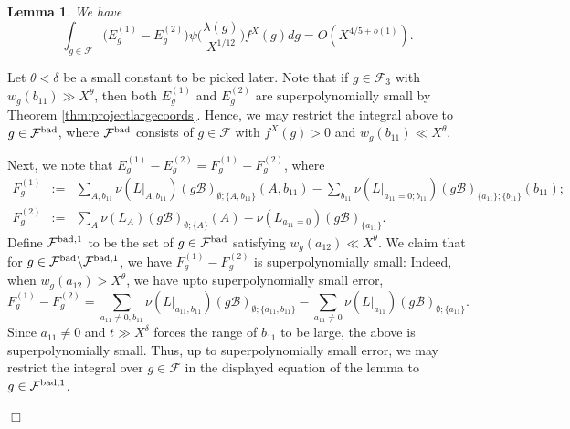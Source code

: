 \documentclass{article}
\def\bad{{\rm bad}}
\def\cB{{\mathcal B}}
\def\FF{{\mathcal F}}
\newtheorem{lemma}[theorem]{Lemma}
\newenvironment{proof}{\noindent {\bf Proof:}}{$\Box$ \vspace{2 ex}}
\begin{document}
\begin{lemma}\label{lem:Ab11_to_A_fiber}
We have
\begin{equation*}
\int_{g\in\FF}\bigl(E_g^{(1)}-E_g^{(2)}\bigr)
\psi\Big(\frac{\lambda(g)}{X^{1/12}}\Big)f^X(g)dg
=O(X^{4/5+o(1)}).
\end{equation*}
\end{lemma}
\begin{proof}
  Let $\theta<\delta$ be a small constant to be picked later. Note that if $g\in\FF_3$ with $w_g(b_{11})\gg X^\theta$, then both $E_g^{(1)}$ and $E_g^{(2)}$ are superpolynomially small by Theorem \ref{thm:projectlargecoords}. Hence, we may restrict the integral above to $g\in\FF^\bad$, where $\FF^\bad$ consists of $g\in\FF$ with $f^X(g)>0$ and $w_g(b_{11})\ll X^\theta$.


Next, we note that $E_g^{(1)}-E_g^{(2)}=F_g^{(1)}-F_g^{(2)}$, where 
\begin{equation*}
\begin{array}{rcl}
F^{(1)}_g&:=&\displaystyle\sum_{A,b_{11}}\nu(L|_{A,b_{11}})(g\cB)_{\emptyset;\{A,b_{11}\}}(A,b_{11})-\sum_{b_{11}}\nu(L|_{a_{11}=0;b_{11}})(g\cB)_{\{a_{11}\};\{b_{11}\}}(b_{11});
\\[.15in]
F^{(2)}_g&:=&\displaystyle\sum_{A}\nu(L_{A})(g\cB)_{\emptyset;\{A\}}(A)-\nu(L_{a_{11}=0})(g\cB)_{\{a_{11}\}}.
\end{array}
\end{equation*}
Define $\FF^{\bad,1}$ to be the set of $g\in\FF^{\bad}$ satisfying $w_g(a_{12})\ll X^\theta$. We claim that for $g\in\FF^\bad\backslash\FF^{\bad,1}$, we have $F_g^{(1)}-F_g^{(2)}$ is superpolynomially small: 
Indeed, when $w_g(a_{12})>X^\theta$, we have upto superpolynomially small error,
\begin{equation*}
F_g^{(1)}-F_g^{(2)}=\sum_{a_{11}\neq 0,b_{11}}
\nu(L|_{a_{11},b_{11}})(g\cB)_{\emptyset;\{a_{11},b_{11}\}}
-\sum_{a_{11}\neq 0}
\nu(L|_{a_{11}})(g\cB)_{\emptyset;\{a_{11}\}}.
\end{equation*}
Since $a_{11}\neq 0$ and $t\gg X^\delta$ forces the range of $b_{11}$ to be large, the above is superpolynomially small.
Thus, up to superpolynomially small error, we may restrict the integral over $g\in\FF$ in the displayed equation of the lemma to $g\in\FF^{\bad,1}$. 



\end{proof}
\end{document}
